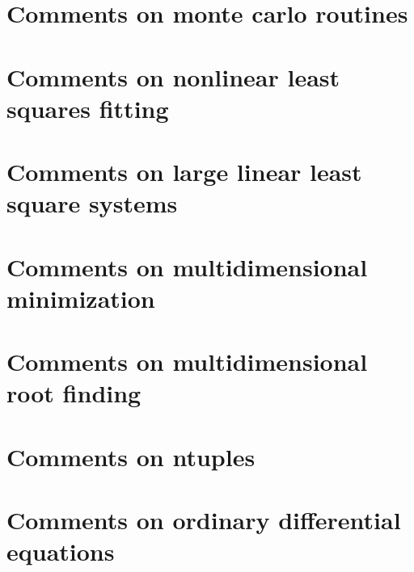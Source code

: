 \documentclass[twoside]{book}
\newcommand{\+}{\discretionary{\mbox{\scriptsize$\hookleftarrow$}}{}{}}
\begin{document}
\chapter{Comments on monte carlo routines}
\label{Comments_01on_01monte_01carlo_01routines}
\hypertarget{Comments_01on_01monte_01carlo_01routines}{}

\chapter{Comments on nonlinear least squares fitting}
\label{Comments_01on_01nonlinear_01least_01squares_01fitting}
\hypertarget{Comments_01on_01nonlinear_01least_01squares_01fitting}{}

\chapter{Comments on large linear least square systems}
\label{Comments_01on_01large_01linear_01least_01square_01systems}
\hypertarget{Comments_01on_01large_01linear_01least_01square_01systems}{}

\chapter{Comments on multidimensional minimization}
\label{Comments_01on_01multidimensional_01minimization}
\hypertarget{Comments_01on_01multidimensional_01minimization}{}

\chapter{Comments on multidimensional root finding}
\label{Comments_01on_01multidimensional_01root_01finding}
\hypertarget{Comments_01on_01multidimensional_01root_01finding}{}

\chapter{Comments on ntuples}
\label{Comments_01on_01ntuples}
\hypertarget{Comments_01on_01ntuples}{}

\chapter{Comments on ordinary differential equations}
\label{Comments_01on_01ordinary_01differential_01equations}
\hypertarget{Comments_01on_01ordinary_01differential_01equations}{}

\end{document}
